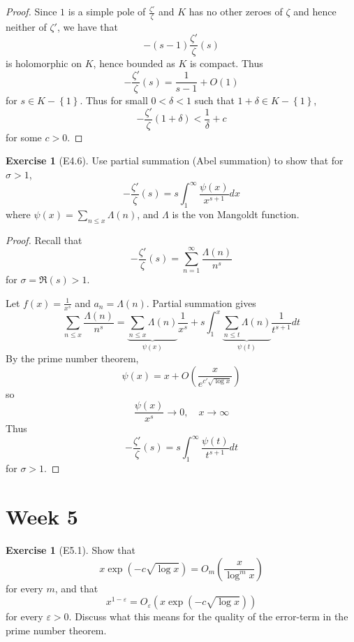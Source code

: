 \documentclass[reqno]{amsart}
\theoremstyle{definition}
\newtheorem{exercise}[theorem]{Exercise}
\theoremstyle{remark}
\begin{document}
\begin{proof}
    Since $1$ is a simple pole of
    $\frac{\zeta'}{\zeta}$ and 
    $K$ has no other zeroes of $\zeta$ and hence
    neither of $\zeta'$, we have that
    \[
    - (s-1) \frac{\zeta'}{\zeta}(s)
    \] 
    is holomorphic on $K$, hence bounded as $K$ is compact.
    Thus
    \[
    - \frac{\zeta'}{\zeta}(s) = \frac{1}{s-1} + O(1)
    \] 
    for $s \in K -\left\{ 1 \right\} $. Thus for small
    $0 < \delta < 1$ such that
    $1 + \delta \in K - \left\{ 1 \right\} $,
    \[
    - \frac{\zeta'}{\zeta}\left( 1+ \delta \right) 
    < \frac{1}{\delta} + c
    \] 
    for some $c > 0$.
\end{proof}


\begin{exercise}[E4.6]
    Use partial summation (Abel summation)
    to show that for $\sigma > 1$,
    \[
    - \frac{\zeta'}{\zeta}(s) = 
    s \int_{1}^{\infty} \frac{\psi (x)}{x^{s+1}} dx 
    \] 
    where $\psi (x) = \sum_{n\le x}
    \Lambda (n)$, and $\Lambda$ is the von Mangoldt function.
\end{exercise}

\begin{proof}
    Recall that
    \[
    - \frac{\zeta'}{\zeta}(s) = 
    \sum_{n=1}^{\infty} \frac{\Lambda (n)}{n^{s}}
    \] 
    for $ \sigma = \Re (s) > 1$.

    Let $f(x) = \frac{1}{x^{s}}$ and
    $a_n = \Lambda (n)$.
    Partial summation gives
    \[
    \sum_{n\le x} \frac{\Lambda (n)}{n^{s}}
    = \underbrace{\sum_{n\le x} \Lambda(n)}_{\psi (x)}
    \frac{1}{x^{s}}
    +s \int_{1}^{x}  \underbrace{\sum_{n\le t} \Lambda (n)}_{\psi (t)} \frac{1}{t^{s+1}} dt
    \] 
    By the prime number theorem,
    \[
    \psi (x) = x + O
    \left( \frac{x}{e^{c' \sqrt{\log x} }} \right) 
    \] 
    so
    \[
    \frac{\psi (x)}{x^{s}} \to 0, \quad x \to \infty
    \] 
    Thus
    \[
    - \frac{\zeta'}{\zeta} (s)
    = s \int_{1}^{\infty} \frac{\psi (t)}{t^{s+1}}dt 
    \] 
    for $\sigma > 1$.
\end{proof}



\section{Week 5}

\begin{exercise}[E5.1]
    Show that
    \[
    x \exp \left( -c \sqrt{\log x}  \right) 
    = O_m \left( \frac{x}{\log^{m} x} \right) 
    \] 
    for every $m$, and that
    \[
    x^{1-\varepsilon} = O_{\varepsilon}
    \left( x \exp \left( -c \sqrt{\log x}  \right)  \right) 
    \] 
    for every $\varepsilon > 0$. Discuss what this
    means for the quality of the error-term in the
    prime number theorem.
\end{exercise}
\end{document}
